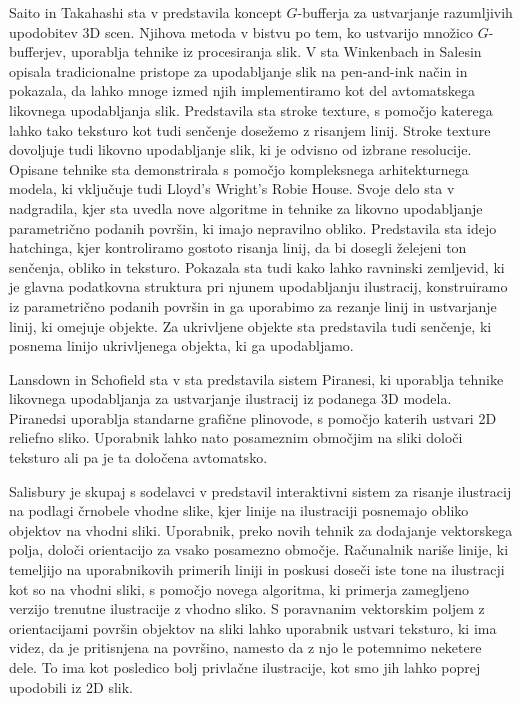 Saito in Takahashi sta v \cite{Saito:3Dshapes} predstavila koncept $G$-bufferja %
za ustvarjanje razumljivih upodobitev 3D scen. Njihova metoda v bistvu po tem, ko ustvarijo množico $G$-bufferjev, uporablja tehnike iz procesiranja slik. V \cite{Wikenbach:ComputerGenerated} sta Winkenbach in Salesin opisala tradicionalne pristope za upodabljanje slik na pen-and-ink način in pokazala, da lahko mnoge izmed njih implementiramo kot del avtomatskega likovnega upodabljanja slik. Predstavila sta stroke texture, %
s pomočjo katerega lahko tako teksturo kot tudi senčenje dosežemo z risanjem linij. Stroke texture dovoljuje tudi likovno upodabljanje slik, ki je odvisno od izbrane resolucije. Opisane tehnike sta demonstrirala s pomočjo kompleksnega arhitekturnega modela, ki vključuje tudi Lloyd's Wright's Robie House. Svoje delo sta v \cite{Winkenbach:ParametricSurfaces} nadgradila, kjer sta uvedla nove algoritme in tehnike za likovno upodabljanje parametrično podanih površin, ki imajo nepravilno obliko. Predstavila sta idejo hatchinga, %
kjer kontroliramo gostoto risanja linij, da bi dosegli želejeni ton senčenja, obliko in teksturo. Pokazala sta tudi kako lahko ravninski zemljevid, %
ki je glavna podatkovna struktura pri njunem upodabljanju ilustracij, konstruiramo iz parametrično podanih površin in ga uporabimo za rezanje linij in ustvarjanje linij, ki omejuje objekte. Za ukrivljene objekte sta predstavila tudi senčenje, ki posnema linijo ukrivljenega objekta, ki ga upodabljamo.

Lansdown in Schofield sta v \cite{Lansdown:Expressive} sta predstavila sistem Piranesi, ki uporablja tehnike likovnega upodabljanja za ustvarjanje ilustracij iz podanega 3D modela. Piranedsi uporablja standarne grafične plinovode, %
s pomočjo katerih ustvari 2D reliefno sliko. Uporabnik lahko nato posameznim območjim na sliki določi teksturo ali pa je ta določena avtomatsko.

Salisbury je skupaj s sodelavci v \cite{Salisbury:OrientableTextures} predstavil interaktivni sistem za risanje ilustracij na podlagi črnobele vhodne slike, kjer linije na ilustraciji posnemajo obliko objektov na vhodni sliki. Uporabnik, preko novih tehnik za dodajanje vektorskega polja, določi orientacijo za vsako posamezno območje. Računalnik nariše linije, ki temeljijo na uporabnikovih primerih liniji in poskusi doseči iste tone na ilustracji kot so na vhodni sliki, s pomočjo novega algoritma, ki primerja zamegljeno verzijo trenutne ilustracije z vhodno sliko. S poravnanim vektorskim poljem z orientacijami površin objektov na sliki lahko uporabnik ustvari teksturo, ki ima videz, da je pritisnjena na površino, namesto da z njo le potemnimo neketere dele. To ima kot posledico bolj privlačne ilustracije, kot smo jih lahko poprej upodobili iz 2D slik.

